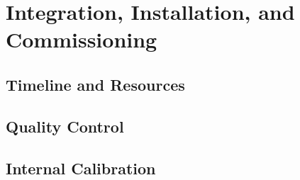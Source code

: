 \section{Integration, Installation, and Commissioning}
\label{sec:fdsp-tpcelec-integration}

\subsection{Timeline and Resources}
\label{sec:fdsp-tpcelec-integration-timeline}

\subsection{Quality Control}
\label{sec:fdsp-tpcelec-integration-qc}

\subsection{Internal Calibration}
\label{sec:fdsp-tpcelec-integration-calib}
